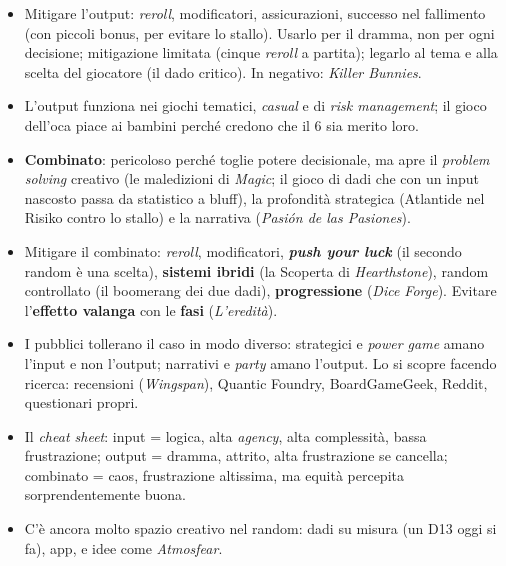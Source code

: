 \begin{itemize}
        ricompensa e a livellare le abilità; la troppa sfortuna toglie \emph{agency}. Poco
        all'inizio, di più verso la fine, senza annullare ciò che è avvenuto prima.
  \item Mitigare l'output: \emph{reroll}, modificatori, assicurazioni, successo nel
        fallimento (con piccoli bonus, per evitare lo stallo). Usarlo per il dramma, non per
        ogni decisione; mitigazione limitata (cinque \emph{reroll} a partita); legarlo al tema
        e alla scelta del giocatore (il dado critico). In negativo: \emph{Killer Bunnies}.
  \item L'output funziona nei giochi tematici, \emph{casual} e di \emph{risk management}; il
        gioco dell'oca piace ai bambini perché credono che il 6 sia merito loro.
  \item \textbf{Combinato}: pericoloso perché toglie potere decisionale, ma apre il
        \emph{problem solving} creativo (le maledizioni di \emph{Magic}; il gioco di dadi che
        con un input nascosto passa da statistico a bluff), la profondità strategica
        (Atlantide nel Risiko contro lo stallo) e la narrativa (\emph{Pasión de las Pasiones}).
  \item Mitigare il combinato: \emph{reroll}, modificatori, \textbf{\emph{push your luck}} (il
        secondo random è una scelta), \textbf{sistemi ibridi} (la Scoperta di
        \emph{Hearthstone}), random controllato (il boomerang dei due dadi),
        \textbf{progressione} (\emph{Dice Forge}). Evitare l'\textbf{effetto valanga} con le
        \textbf{fasi} (\emph{L'eredità}).
  \item I pubblici tollerano il caso in modo diverso: strategici e \emph{power game} amano
        l'input e non l'output; narrativi e \emph{party} amano l'output. Lo si scopre facendo
        ricerca: recensioni (\emph{Wingspan}), Quantic Foundry, BoardGameGeek, Reddit,
        questionari propri.
  \item Il \emph{cheat sheet}: input = logica, alta \emph{agency}, alta complessità, bassa
        frustrazione; output = dramma, attrito, alta frustrazione se cancella; combinato =
        caos, frustrazione altissima, ma equità percepita sorprendentemente buona.
  \item C'è ancora molto spazio creativo nel random: dadi su misura (un D13 oggi si fa), app,
        e idee come \emph{Atmosfear}.
\end{itemize}
